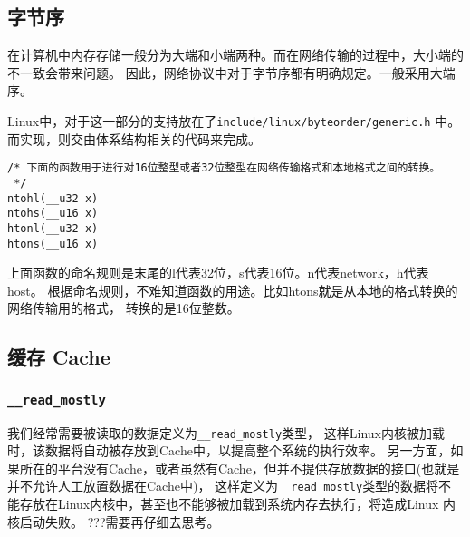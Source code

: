 		\subsection{字节序}
			在计算机中内存存储一般分为大端和小端两种。而在网络传输的过程中，大小端的不一致会带来问题。
因此，网络协议中对于字节序都有明确规定。一般采用大端序。

			Linux中，对于这一部分的支持放在了\texttt{include/linux/byteorder/generic.h}
中。而实现，则交由体系结构相关的代码来完成。

\begin{verbatim}
/* 下面的函数用于进行对16位整型或者32位整型在网络传输格式和本地格式之间的转换。
 */
ntohl(__u32 x)
ntohs(__u16 x)
htonl(__u32 x)
htons(__u16 x)
\end{verbatim}

			上面函数的命名规则是末尾的l代表32位，s代表16位。n代表network，h代表host。
根据命名规则，不难知道函数的用途。比如htons就是从本地的格式转换的网络传输用的格式，
转换的是16位整数。
		\subsection{缓存 Cache}
			\subsubsection{\texttt{__read_mostly}}
				我们经常需要被读取的数据定义为\texttt{__read_mostly}类型，
				这样Linux内核被加载时，该数据将自动被存放到Cache中，以提高整个系统的执行效率。
				另一方面，如果所在的平台没有Cache，或者虽然有Cache，但并不提供存放数据的接口(也就是并不允许人工放置数据在Cache中)，
				这样定义为\texttt{__read_mostly}类型的数据将不能存放在Linux内核中，甚至也不能够被加载到系统内存去执行，将造成Linux 内核启动失败。
				???需要再仔细去思考。
				
